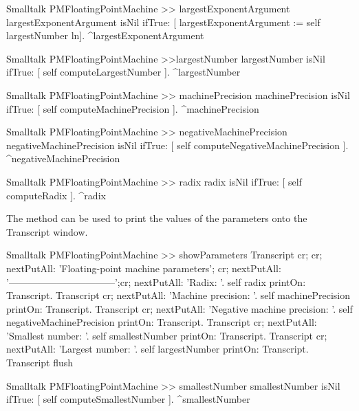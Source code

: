 \begin{displaycode}{Smalltalk}
PMFloatingPointMachine >> largestExponentArgument
    largestExponentArgument isNil
        ifTrue: [ largestExponentArgument := self largestNumber ln].
    ^largestExponentArgument
\end{displaycode}

\begin{displaycode}{Smalltalk}
PMFloatingPointMachine >>largestNumber
    largestNumber isNil
        ifTrue: [ self computeLargestNumber ].
    ^largestNumber
\end{displaycode}

\begin{displaycode}{Smalltalk}
PMFloatingPointMachine >> machinePrecision
    machinePrecision isNil
        ifTrue: [ self computeMachinePrecision ].
    ^machinePrecision
\end{displaycode}

\begin{displaycode}{Smalltalk}
PMFloatingPointMachine >> negativeMachinePrecision
    negativeMachinePrecision isNil
        ifTrue: [ self computeNegativeMachinePrecision ].
    ^negativeMachinePrecision
\end{displaycode}

\begin{displaycode}{Smalltalk}
PMFloatingPointMachine >> radix
    radix isNil
        ifTrue: [ self computeRadix ].
    ^radix
\end{displaycode}

\noindent The method  can be used to print the
values of the parameters onto the Transcript window.

\begin{displaycode}{Smalltalk}
PMFloatingPointMachine >> showParameters
  Transcript cr; cr;
    nextPutAll: 'Floating-point machine parameters'; cr;
    nextPutAll: '---------------------------------';cr;
    nextPutAll: 'Radix: '.
  self radix printOn: Transcript.
  Transcript cr; nextPutAll: 'Machine precision: '.
  self machinePrecision printOn: Transcript.
  Transcript cr; nextPutAll: 'Negative machine precision: '.
  self negativeMachinePrecision printOn: Transcript.
  Transcript cr; nextPutAll: 'Smallest number: '.
  self smallestNumber printOn: Transcript.
  Transcript cr; nextPutAll: 'Largest number: '.
  self largestNumber printOn: Transcript.
  Transcript flush
\end{displaycode}

\begin{displaycode}{Smalltalk}
PMFloatingPointMachine >> smallestNumber
    smallestNumber isNil
        ifTrue: [ self computeSmallestNumber ].
    ^smallestNumber
\end{displaycode}

